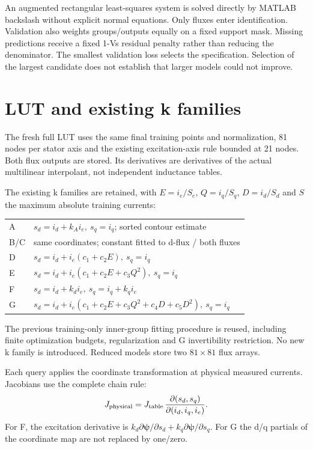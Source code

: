\documentclass[11pt,a4paper]{article}
\begin{document}
An augmented rectangular least-squares system is solved directly by MATLAB backslash without explicit normal equations. Only fluxes enter identification. Validation also weights groups/outputs equally on a fixed support mask. Missing predictions receive a fixed 1-Vs residual penalty rather than reducing the denominator. The smallest validation loss selects the specification. Selection of the largest candidate does not establish that larger models could not improve.

\section{LUT and existing k families}
The fresh full LUT uses the same final training points and normalization, 81 nodes per stator axis and the existing excitation-axis rule bounded at 21 nodes. Both flux outputs are stored. Its derivatives are derivatives of the actual multilinear interpolant, not independent inductance tables.

The existing k families are retained, with $E=i_e/S_e$, $Q=i_q/S_q$, $D=i_d/S_d$ and $S$ the maximum absolute training currents:
\begin{center}\small
\begin{tabular}{ll}\toprule
A & $s_d=i_d+k_Ai_e,\ s_q=i_q$; sorted contour estimate\\
B/C & same coordinates; constant fitted to d-flux / both fluxes\\
D & $s_d=i_d+i_e(c_1+c_2E),\ s_q=i_q$\\
E & $s_d=i_d+i_e(c_1+c_2E+c_3Q^2),\ s_q=i_q$\\
F & $s_d=i_d+k_di_e,\ s_q=i_q+k_qi_e$\\
G & $s_d=i_d+i_e(c_1+c_2E+c_3Q^2+c_4D+c_5D^2),\ s_q=i_q$\\
\bottomrule\end{tabular}
\end{center}
The previous training-only inner-group fitting procedure is reused, including finite optimization budgets, regularization and G invertibility restriction. No new k family is introduced. Reduced models store two $81\times81$ flux arrays.

Each query applies the coordinate transformation at physical measured currents. Jacobians use the complete chain rule:
\begin{equation}
 J_{\rm physical}=J_{\rm table}\,
 \frac{\partial(s_d,s_q)}{\partial(i_d,i_q,i_e)}.
\end{equation}
For F, the excitation derivative is $k_d\partial\bm\psi/\partial s_d+k_q\partial\bm\psi/\partial s_q$. For G the d/q partials of the coordinate map are not replaced by one/zero.
\end{document}
